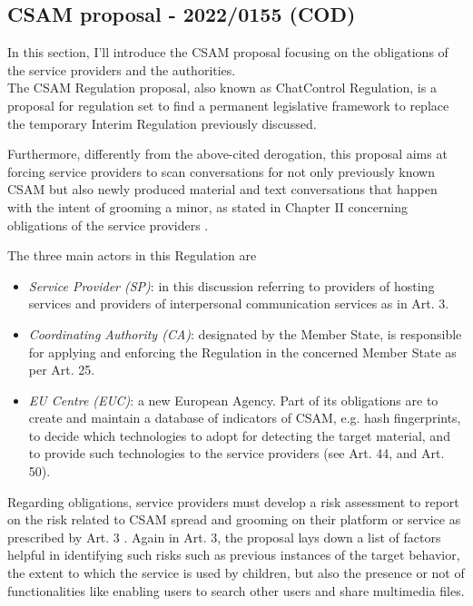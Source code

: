 \subsection{CSAM proposal - 2022/0155 (COD)}

In this section, I'll introduce the CSAM proposal focusing on the obligations of the service providers and the authorities. \\

The CSAM Regulation proposal, also known as ChatControl Regulation, is a proposal for regulation set to find a permanent legislative framework to replace the temporary Interim Regulation previously discussed. 

Furthermore, differently from the above-cited derogation, this proposal aims at forcing service providers to scan conversations for not only previously known CSAM but also newly produced material and text conversations that happen with the intent of grooming a minor, as stated in Chapter II concerning obligations of the service providers \cite {eu2023chatcontrol}.

The three main actors in this Regulation are

\begin{itemize}
    \item \textit{Service Provider (SP)}: in this discussion referring to providers of hosting services and providers of interpersonal communication services as in Art. 3.
    \item \textit{Coordinating Authority (CA)}: designated by the Member State, is responsible for applying and enforcing the Regulation in the concerned Member State as per Art. 25.
    \item \textit{EU Centre (EUC)}: a new European Agency. Part of its obligations are to create and maintain a database of indicators of CSAM, e.g. hash fingerprints, to decide which technologies to adopt for detecting the target material, and to provide such technologies to the service providers (see Art. 44, and Art. 50).
\end{itemize}

Regarding obligations, service providers must develop a risk assessment to report on the risk related to CSAM spread and grooming on their platform or service as prescribed by Art. 3 \cite{eu2023chatcontrol}. 
Again in Art. 3, the proposal lays down a list of factors helpful in identifying such risks such as previous instances of the target behavior, the extent to which the service is used by children, but also the presence or not of functionalities like enabling users to search other users and share multimedia files.

